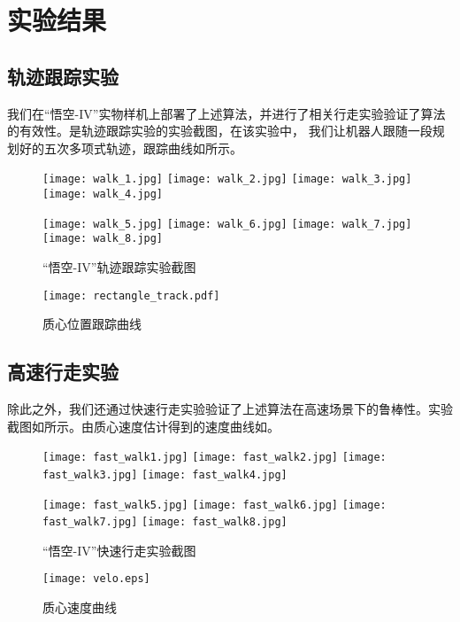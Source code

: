 \section{实验结果}
\subsection{轨迹跟踪实验}
\label{sec:controller_exp}
我们在“悟空-IV”实物样机上部署了上述算法，并进行了相关行走实验验证了算法的有效性。是轨迹跟踪实验的实验截图，在该实验中，
我们让机器人跟随一段规划好的五次多项式轨迹，跟踪曲线如所示。
\begin{figure}[htbp]
    \centering
    \texttt{[image: walk\_1.jpg]}
    \texttt{[image: walk\_2.jpg]}
    \texttt{[image: walk\_3.jpg]}
    \texttt{[image: walk\_4.jpg]}

    \texttt{[image: walk\_5.jpg]}
    \texttt{[image: walk\_6.jpg]}
    \texttt{[image: walk\_7.jpg]}
    \texttt{[image: walk\_8.jpg]}   
    \caption{\label{fig:track_exp}“悟空-IV”轨迹跟踪实验截图}
\end{figure}
\begin{figure}[htbp]
    \centering
    \texttt{[image: rectangle\_track.pdf]}
    \caption{\label{fig:com_pos_track}质心位置跟踪曲线}
\end{figure}
\subsection{高速行走实验}
除此之外，我们还通过快速行走实验验证了上述算法在高速场景下的鲁棒性。实验截图如所示。由质心速度估计得到的速度曲线如。
\begin{figure}[htbp]
    \centering
    \texttt{[image: fast\_walk1.jpg]}
    \texttt{[image: fast\_walk2.jpg]}
    \texttt{[image: fast\_walk3.jpg]}
    \texttt{[image: fast\_walk4.jpg]}

    \texttt{[image: fast\_walk5.jpg]}
    \texttt{[image: fast\_walk6.jpg]}
    \texttt{[image: fast\_walk7.jpg]}
    \texttt{[image: fast\_walk8.jpg]}   
    \caption{\label{fig:track_exp}“悟空-IV”快速行走实验截图}
\end{figure}
\begin{figure}[htbp]
    \centering
    \texttt{[image: velo.eps]}
    \caption{\label{fig:com_vel_track}质心速度曲线}
\end{figure}
